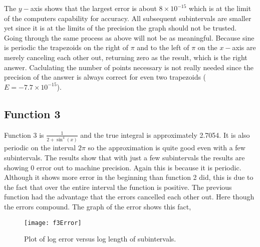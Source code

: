 \documentclass[]{article}
\begin{document}
The $ y- $axis shows that the largest error is about $ 8 \times 10^{-15} $ which is at the limit of the computers capability for accuracy. All subsequent subintervals are smaller yet since it is at the limits of the precision the graph should not be trusted. \\
Going through the same process as above will not be as meaningful. Because sine is periodic the trapezoids on the right of $ \pi $ and to the left of $ \pi $ on the $ x-$axis are merely canceling each other out, returning zero as the result, which is the right answer. Caclulating the number of points necessary is not really needed since the precision of the answer is always correct for even two trapezoids ($ E = -7.7 \times 10^{-15} $). 
	
\subsection*{Function 3} 	
Function 3 is $ \frac{1}{2+ \sin^4(x)} $	and the true integral is approximately 2.7054. It is also periodic on the interval $ 2\pi $ so the approximation is quite good even with a few subintervals. The results show that with just a few subintervals the results are showing 0 error out to machine precision. Again this is because it is periodic. Although it shows more error in the beginning than function 2 did, this is due to the fact  that over the entire interval the function is positive. The previous function had the advantage that the errors cancelled each other out. Here though the errors compound. The graph of the error shows this fact, 

\begin{figure}[H]
	\centering
	\texttt{[image: f3Error]}
\caption{Plot of log error versus log length of subintervals.}
\end{figure}
\end{document}
